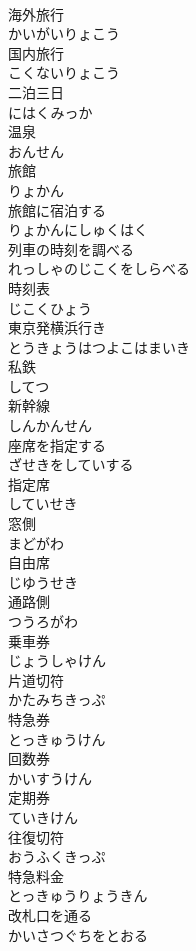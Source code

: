 \documentclass[8pt]{extreport}
\begin{document}
\begin{CJK}{UTF8}{min}
\\	海外旅行	
\\	かいがいりょこう
\\	国内旅行	
\\	こくないりょこう
\\	二泊三日	
\\	にはくみっか
\\	温泉	
\\	おんせん
\\	旅館	
\\	りょかん
\\	旅館に宿泊する	
\\	りょかんにしゅくはく
\\	列車の時刻を調べる	
\\	れっしゃのじこくをしらべる
\\	時刻表	
\\	じこくひょう
\\	東京発横浜行き	
\\	とうきょうはつよこはまいき
\\	私鉄	
\\	してつ
\\	新幹線	
\\	しんかんせん
\\	座席を指定する	
\\	ざせきをしていする
\\	指定席	
\\	していせき
\\	窓側	
\\	まどがわ
\\	自由席	
\\	じゆうせき
\\	通路側	
\\	つうろがわ
\\	乗車券	
\\	じょうしゃけん
\\	片道切符	
\\	かたみちきっぷ
\\	特急券	
\\	とっきゅうけん
\\	回数券	
\\	かいすうけん
\\	定期券	
\\	ていきけん
\\	往復切符	
\\	おうふくきっぷ
\\	特急料金	
\\	とっきゅうりょうきん
\\	改札口を通る	
\\	かいさつぐちをとおる

\end{CJK}
\end{document}
